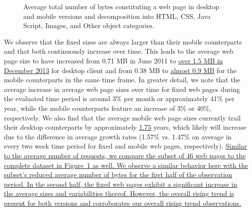 \documentclass[onecolumn,12pt]{IEEEtran}
\begin{document}
\begin{figure}
	\qquad
	\caption{Average total number of bytes constituting a web page in desktop and mobile versions and decomposition into  HTML, CSS, Java Script, Images, and Other object categories.\label{fig:sizes}}
\end{figure}

We observe that the fixed sizes are always larger than their mobile counterparts and that both continuously increase over time. 
This leads to the average web page size to have increased from 0.71 MB in June 2011 to \uline{over 1.5 MB in December 2013} for desktop client and from 0.38 MB to \uline{almost 0.9 MB} for the mobile counterparts in the same time frame.
In greater detail, we note that the average increase in average web page sizes over time for fixed web pages during the evaluated time period is around 3\% per month or approximately 41\% per year, while the mobile counterparts feature an increase of 3\% or 40\%, respectively.
We also find that the average mobile web page sizes currently trail their desktop counterparts by approximately \uline{1.75} years, which likely will increase due to the difference in average growth rates (1.57\% vs. 1.47\% on average in every two week time period for fixed and mobile web pages, respectively).
\uline{Similar to the average number of requests, we compare the subset of 46 web pages to the complete dataset in Figure~\ref{fig:sizes} as well.
We observe a similar behavior here with the subset's reduced average number of bytes for the first half of the observation period. In the second half, the fixed web pages exhibit a significant increase in the average sizes and variabilities thereof. 
However, the overall rising trend is present for both versions and corroborates our overall rising trend observations.}
\end{document}
